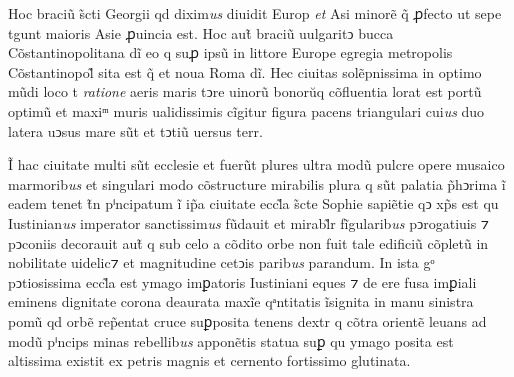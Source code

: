\documentclass[12pt, a4paper]{book}
\newcommand{\styleabbr}[1]{\textit{#1}}
\begin{document}
	\pend
	
				
	\pstart
	
					Hoc braciũ s̃cti Georgii qd dixim\styleabbr{us} diuidit Europ\styleabbr{} \styleabbr{et} Asi\styleabbr{} minorẽ
					q̃ ꝓfecto ut  sepe t\styleabbr{}gunt maioris Asie ꝓuincia est. Hoc aut̃ braciũ
					uulgaritↄ bucca Cõstantinopolitana dĩ eo q suꝓ ipsũ in littore Europe egregia
					metropolis Cõstantinopol̃ sita est q̃ et noua Roma dĩ. Hec ciuitas solẽpnissima
					in optimo mũdi loco t\styleabbr{} \styleabbr{ratione} aeris maris tↄre uinorũ bonorŭq 
					cõfluentia lorat est portũ  optimũ et maxiᵐ muris ualidissimis
					cĩgitur figura pacens triangulari cui\styleabbr{us} duo latera uↄsus mare sũt et tↄtiũ
					uersus terr\styleabbr{}.
				
	\pend
	
				
	\pstart
	
				Ĩ hac ciuitate multi sũt ecclesie et fuerũt plures ultra
				modũ pulcre opere musaico marmorib\styleabbr{us} et singulari modo cõstructure mirabilis
				plura q sũt palatia p̃hↄrima ĩ eadem tenet t̃n pⁱncipatum
				ĩ ip̃a ciuitate eccl̃a s̃cte Sophie  sapiẽtie qↄ xp̃s est qu\styleabbr{} Iustinian\styleabbr{us} imperator
				sanctissim\styleabbr{us} fũdauit et mirabl̃r fĩgularib\styleabbr{us} pↄrogatiuis ⁊ pↄconiis
				decorauit  aut̃ q sub celo a cõdito orbe non fuit tale edificiũ
				cõpletũ in nobilitate uidelic⁊ et magnitudine cetↄis parib\styleabbr{us}  parandum.
				In ista gᵒ pↄtiosissima eccl̃a est ymago imꝑatoris Iustiniani eques ⁊ de ere fusa
				imꝑiali eminens dignitate corona deaurata maxĩe qᵃntitatis ĩsignita in
				manu sinistra pomũ qd orbẽ rep̃entat cruce suꝑposita tenens dextr\styleabbr{} q cõtra
				orientẽ leuans ad modũ pⁱncips minas rebellib\styleabbr{us} apponẽtis statua suꝑ qu\styleabbr{}
				ymago posita est altissima existit ex petris magnis et cernento fortissimo
				glutinata.
				
	\pend
	
				
			
		
	

			\endnumbering
		
\end{document}
